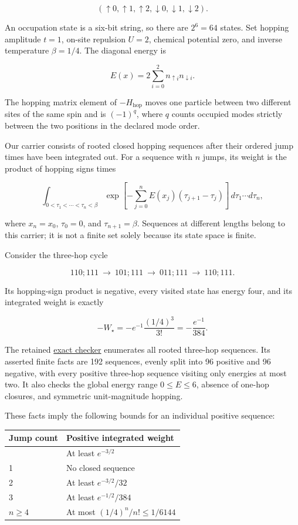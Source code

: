 \documentclass[
  11pt,
]{article}
\begin{document}
\[
(\uparrow0,\uparrow1,\uparrow2,\downarrow0,\downarrow1,\downarrow2).
\]

An occupation state is a six-bit string, so there are \(2^6=64\) states.
Set hopping amplitude \(t=1\), on-site repulsion \(U=2\), chemical
potential zero, and inverse temperature \(\beta=1/4\). The diagonal
energy is

\[
E(x)=2\sum_{i=0}^{2}n_{\uparrow i}n_{\downarrow i}.
\]

The hopping matrix element of \(-H_{\mathrm{hop}}\) moves one particle
between two different sites of the same spin and is \((-1)^q\), where
\(q\) counts occupied modes strictly between the two positions in the
declared mode order.

Our carrier consists of rooted closed hopping sequences after their
ordered jump times have been integrated out. For a sequence with \(n\)
jumps, its weight is the product of hopping signs times

\[
\int_{0<\tau_1<\cdots<\tau_n<\beta}
\exp\!\left[-\sum_{j=0}^{n} E(x_j)(\tau_{j+1}-\tau_j)\right]
\,d\tau_1\cdots d\tau_n,
\]

where \(x_n=x_0\), \(\tau_0=0\), and \(\tau_{n+1}=\beta\). Sequences at
different lengths belong to this carrier; it is not a finite set solely
because its state space is finite.

Consider the three-hop cycle

\[
110;111\ \longrightarrow\ 101;111\
\longrightarrow\ 011;111\ \longrightarrow\ 110;111.
\]

Its hopping-sign product is negative, every visited state has energy
four, and its integrated weight is exactly

\[
-W_\star=-e^{-1}\frac{(1/4)^3}{3!}
=-\frac{e^{-1}}{384}.
\]

The retained
\href{https://github.com/dbccpage/the_symbol_game/blob/c819bec432446dd3c9b1edf1583384cfe76c6c71/omega_engine_atlas/coda_atlas/omega_engine_symbol_game/002_pfp_signed_presentations_and_search_frontier/code/exact_fock_gap.py}{exact
checker} enumerates all rooted three-hop sequences. Its asserted finite
facts are 192 sequences, evenly split into 96 positive and 96 negative,
with every positive three-hop sequence visiting only energies at most
two. It also checks the global energy range \(0\leq E\leq6\), absence of
one-hop closures, and symmetric unit-magnitude hopping.

These facts imply the following bounds for an individual positive
sequence:

\begin{longtable}[]{@{}ll@{}}
\toprule\noalign{}
Jump count & Positive integrated weight \\
\midrule\noalign{}
\endhead
\bottomrule\noalign{}
\endlastfoot
0 & At least \(e^{-3/2}\) \\
1 & No closed sequence \\
2 & At least \(e^{-3/2}/32\) \\
3 & At least \(e^{-1/2}/384\) \\
\(n\geq4\) & At most \((1/4)^n/n!\leq1/6144\) \\
\end{longtable}
\end{document}
